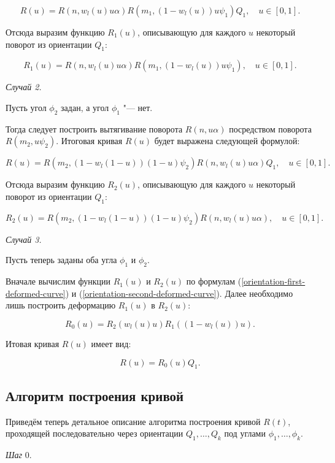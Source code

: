 $$
R(u)=R(n,w_l(u)u\alpha)R(m_1,(1-w_l(u))u\psi_1)Q_1, \quad u \in [0,1].
$$

Отсюда выразим функцию $R_1(u)$, описывающую для каждого $u$ некоторый поворот из ориентации $Q_1$:

\begin{equation}
R_1(u)=R(n,w_l(u)u\alpha)R(m_1,(1-w_l(u))u\psi_1), \quad u \in [0,1].
\label{orientation-first-deformed-curve}
\end{equation}

\bigskip
\textit{Случай 2.}

Пусть угол $\phi_2$ задан, а угол $\phi_1$ "--- нет.

Тогда следует построить вытягивание поворота $R(n,u\alpha)$ посредством поворота $R(m_2,u\psi_2)$. Итоговая кривая
$R(u)$ будет выражена следующей формулой:

$$
R(u)=R(m_2,(1-w_l(1-u))(1-u)\psi_2)R(n,w_l(u)u\alpha)Q_1, \quad u \in [0,1].
$$

Отсюда выразим функцию $R_2(u)$, описывающую для каждого $u$ некоторый поворот из ориентации $Q_1$:

\begin{equation}
R_2(u)=R(m_2,(1-w_l(1-u))(1-u)\psi_2)R(n,w_l(u)u\alpha), \quad u \in [0,1].
\label{orientation-second-deformed-curve}
\end{equation}

\bigskip
\textit{Случай 3.}

Пусть теперь заданы оба угла $\phi_1$ и $\phi_2$.

Вначале вычислим функции $R_1(u)$ и $R_2(u)$ по формулам (\ref{orientation-first-deformed-curve}) и
(\ref{orientation-second-deformed-curve}). Далее необходимо лишь построить деформацию $R_1(u)$ в $R_2(u)$:

$$
R_0(u)=R_2(w_l(u)u)R_1((1-w_l(u))u).
$$

Итовая кривая $R(u)$ имеет вид:

$$
R(u)=R_0(u)Q_1.
$$

\subsection*{Алгоритм построения кривой}

Приведём теперь детальное описание алгоритма построения кривой $R(t)$, проходящей последовательно через ориентации
$Q_1,\dots,Q_k$ под углами $\phi_1,\dots,\phi_k$.

\bigskip
\textit{Шаг} 0.

